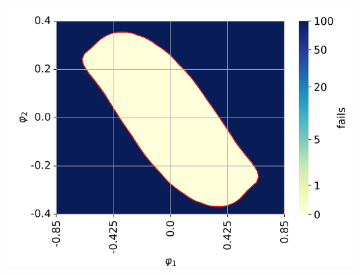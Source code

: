\begin{figure}[h!]
\begin{subfigure}[t]{0.32\textwidth}
         \centering
         \includegraphics[width=\textwidth]{Figures/DP_mass_1.1.png}
         \label{fig: DP mass 1.1}
         \caption{}
     \end{subfigure}

     \vspace{0.2cm}


\end{figure}
